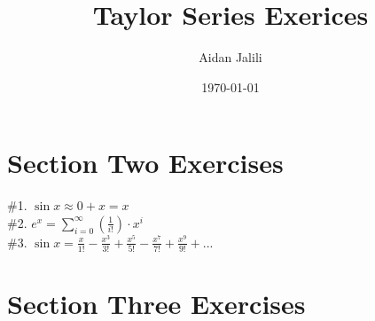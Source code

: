 \documentclass{article} %
\title{Taylor Series Exerices} %
\author{Aidan Jalili} %
\date{\today} %
\begin{document}
    \maketitle %
    \section{Section Two Exercises}
    \#1.
    $\sin x \approx 0 + x = x$\\
    \#2.
    $e^x = \sum_{i=0}^\infty (\frac{1}{i!}) \cdot x^i$\\
    \#3.
    $\sin x = \frac{x}{1!}-\frac{x^3}{3!}+\frac{x^5}{5!}-\frac{x^7}{7!}+\frac{x^9}{9!}+...$
    \section{Section Three Exercises}
\end{document}
